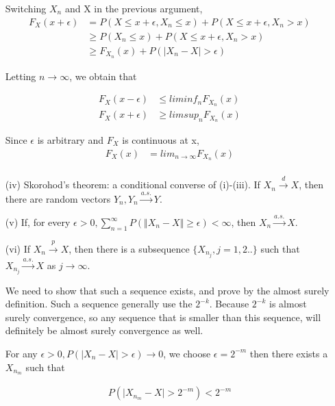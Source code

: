 \begin{itemize}
Switching $X_n$ and X in the previous argument,
 \begin{align*}
   F_X(x + \epsilon) &= P(X \leq x + \epsilon, X_n \leq x) +  P(X \leq x + \epsilon, X_n > x)  \\
   & \geq P(X_n \leq x) + P(X \leq x + \epsilon, X_n > x) \\
   & \geq F_{X_n}(x) + P(|X_n - X| > \epsilon)
 \end{align*}

Letting $n \rightarrow \infty$, we obtain that

 \begin{align*}
   F_X(x - \epsilon) & \leq lim inf_{n} F_{X_n}(x) \\
   F_X(x + \epsilon) & \geq lim sup_{n} F_{X_n}(x)
 \end{align*}

Since $\epsilon$ is arbitrary and $F_X$ is continuous at x, 
 \begin{align*}
   F_X(x ) & = lim_{n \rightarrow \infty} F_{X_n}(x) \\
 \end{align*}

\item[(iv)] Skorohod's theorem: a conditional converse of (i)-(iii). If $X_n \xrightarrow {d} X$, then there are random vectors $Y_n, Y_n \xrightarrow {a.s.} Y$.

\item[(v)] If, for every $\epsilon > 0, \sum_{n=1}^{\infty} P(\Vert X_n -X \Vert \geq \epsilon) < \infty$, then $X_n \xrightarrow {a.s.} X$. 

\item[(vi)] If $X_n \xrightarrow {p} X$, then there is a subsequence $\{ X_{n_j} , j= 1,2..\}$ such that $X_{n_j} \xrightarrow {a.s.} X$ as $j \rightarrow \infty$.

We need to show that such a sequence exists, and prove by the almost surely definition. Such a sequence generally use the $2^{-k}$. 
Because $2^{-k}$ is almost surely convergence, so any sequence that is smaller than this sequence, will definitely be almost surely convergence as well.

For any $\epsilon > 0, P(\Big | X_n -X \Big | > \epsilon) \rightarrow 0$, we choose $\epsilon = 2^{-m}$ then there exists a $X_{n_m}$ such that

 \begin{align*}
   P(\Big | X_{n_m}- X \Big | > 2^{-m}) < 2^{-m}
 \end{align*}
 

\end{itemize}

